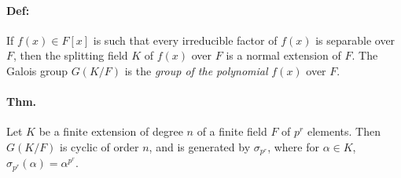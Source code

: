 \documentclass[10pt,a4paper]{article}
\begin{document}
\paragraph{Def:} If $f(x) \in F[x]$ is such that every irreducible factor of $f(x)$ is separable over $F$, then the splitting field $K$ of $f(x)$ over $F$ is a normal extension of $F$. The Galois group $G(K/F)$ is the \textit{group of the polynomial} $f(x)$ over $F$.

\paragraph{Thm.} Let $K$ be a finite extension of degree $n$ of a finite field $F$ of $p^r$ elements. Then $G(K/F)$ is cyclic of order $n$, and is generated by $\sigma_{p^r}$, where for $\alpha \in K$, $\sigma_{p^r}(\alpha) = \alpha^{p^r}$.
\end{document}
